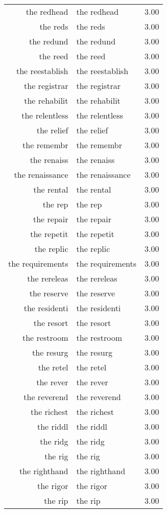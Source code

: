\begin{table}[ht]
\begin{tabular}{rlr}
  the redhead & the redhead & 3.00 \\ 
  the reds & the reds & 3.00 \\ 
  the redund & the redund & 3.00 \\ 
  the reed & the reed & 3.00 \\ 
  the reestablish & the reestablish & 3.00 \\ 
  the registrar & the registrar & 3.00 \\ 
  the rehabilit & the rehabilit & 3.00 \\ 
  the relentless & the relentless & 3.00 \\ 
  the relief & the relief & 3.00 \\ 
  the remembr & the remembr & 3.00 \\ 
  the renaiss & the renaiss & 3.00 \\ 
  the renaissance & the renaissance & 3.00 \\ 
  the rental & the rental & 3.00 \\ 
  the rep & the rep & 3.00 \\ 
  the repair & the repair & 3.00 \\ 
  the repetit & the repetit & 3.00 \\ 
  the replic & the replic & 3.00 \\ 
  the requirements & the requirements & 3.00 \\ 
  the rereleas & the rereleas & 3.00 \\ 
  the reserve & the reserve & 3.00 \\ 
  the residenti & the residenti & 3.00 \\ 
  the resort & the resort & 3.00 \\ 
  the restroom & the restroom & 3.00 \\ 
  the resurg & the resurg & 3.00 \\ 
  the retel & the retel & 3.00 \\ 
  the rever & the rever & 3.00 \\ 
  the reverend & the reverend & 3.00 \\ 
  the richest & the richest & 3.00 \\ 
  the riddl & the riddl & 3.00 \\ 
  the ridg & the ridg & 3.00 \\ 
  the rig & the rig & 3.00 \\ 
  the righthand & the righthand & 3.00 \\ 
  the rigor & the rigor & 3.00 \\ 
  the rip & the rip & 3.00 \\ 

\end{tabular}
\end{table}
